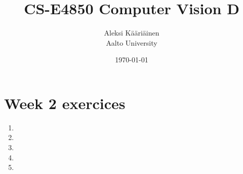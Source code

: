 \documentclass[11pt,a4paper]{article}
\title{CS-E4850 Computer Vision D}
\author{Aleksi Kääriäinen  \\
	Aalto University  \\
	}
\begin{document}
\date{\today}

\maketitle

\newpage

\section*{Week 2 exercices}

\begin{enumerate}
    \item

          \newpage

    \item

          \newpage

    \item

          \newpage

    \item

          \newpage

    \item

          \newpage

\end{enumerate}
\end{document}
